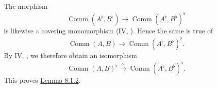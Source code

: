 The morphism
\[
  \operatorname{Comm}(A^\flat,B^\flat)
    \longrightarrow
  \operatorname{Comm}(A^\flat,B^\flat)^\flat
\]
is likewise a covering monomorphism
(IV, \textup{}). Hence the same is true of
\[
  \operatorname{Comm}(A,B)
    \longrightarrow
  \operatorname{Comm}(A^\flat,B^\flat)^\flat.
\]
By IV, , we therefore obtain an isomorphism
\[
  \operatorname{Comm}(A,B)^\flat
    \xrightarrow{\ \sim\ }
  \operatorname{Comm}(A^\flat,B^\flat)^\flat.
\]
This proves \hyperref[lem:sga3-VIB-8.1.2]{Lemma 8.1.2}.
